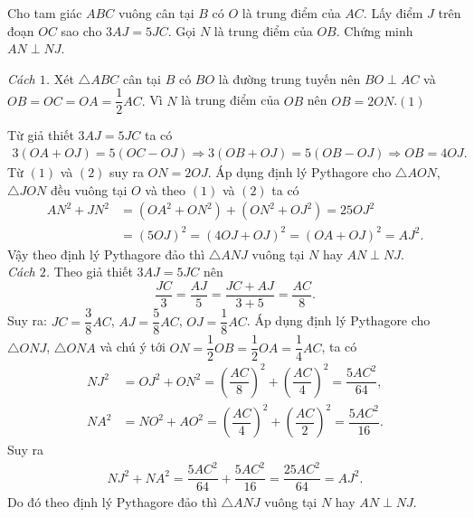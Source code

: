 \begin{bt}%
Cho tam giác $ABC$ vuông cân tại $B$ có $O$ là trung điểm của $AC$. Lấy điểm $J$ trên đoạn $OC$ sao cho $3AJ=5JC$. Gọi $N$ là trung điểm của $OB$. Chứng minh $AN \perp NJ$.
\loigiai
{\textit{Cách $1$.} Xét $\triangle ABC$ cân tại $B$ có $BO$ là đường trung tuyến nên $BO \perp AC$ và $OB = OC =OA = \dfrac{1}{2} AC.$ Vì $N$ là trung điểm của $OB$ nên $OB = 2 ON$.\hfill$(1)$\\
	\begin{center}
	\end{center}
Từ giả thiết $3AJ=5JC$ ta có
\begin{align}
3(OA+OJ)=5(OC-OJ) \Rightarrow 3(OB+OJ)=5(OB-OJ)\Rightarrow OB=4OJ. \tag{2}
\end{align}
Từ $(1)$ và $(2)$ suy ra $ON=2OJ$. Áp dụng định lý Pythagore cho $\triangle AON$, $\triangle JON$ đều vuông tại $O$ và theo $(1)$ và $(2)$ ta có
\begin{align*}
AN^2 + JN^2 &= \left( OA^2 + ON^2\right) + \left( ON^2 + OJ^2\right) = 25 OJ^2 \\
&= \left( 5 OJ \right) ^2 = \left( 4 OJ + OJ\right) ^2 = \left( OA + OJ \right) ^2 = AJ^2.
\end{align*}
Vậy theo định lý Pythagore đảo thì $\triangle ANJ$ vuông tại $N$ hay $AN \perp NJ$.\\
\textit{Cách $2$.} Theo giả thiết $3AJ=5JC$ nên
$$ \dfrac{JC}{3}= \dfrac{AJ}{5}= \dfrac{JC + AJ}{3+5}= \dfrac{AC}{8}. $$
Suy ra: $JC= \dfrac{3}{8} AC$, $AJ= \dfrac{5}{8} AC$, $OJ= \dfrac{1}{8} AC$. Áp dụng định lý Pythagore cho $\triangle ONJ$, $\triangle ONA$ và chú ý tới $ON = \dfrac{1}{2} OB = \dfrac{1}{2} OA = \dfrac{1}{4} AC $, ta có
\begin{align*}
NJ^2 &= OJ^2 + ON^2 = \left( \dfrac{AC}{8}\right) ^2 + \left( \dfrac{AC}{4}\right) ^2 = \dfrac{5 AC^2}{64},\\
NA^2 &= NO^2 + AO^2 = \left( \dfrac{AC}{4}\right) ^2 + \left( \dfrac{AC}{2}\right) ^2 = \dfrac{5 AC^2}{16}.
\end{align*}
Suy ra
\begin{align*} NJ^2 + NA^2 = \dfrac{5 AC^2}{64} + \dfrac{5 AC^2}{16} = \dfrac{25 AC^2}{64} = AJ^2.
\end{align*}
Do đó theo định lý Pythagore đảo thì $\triangle ANJ$ vuông tại $N$ hay $AN \perp NJ$.
}
\end{bt}
